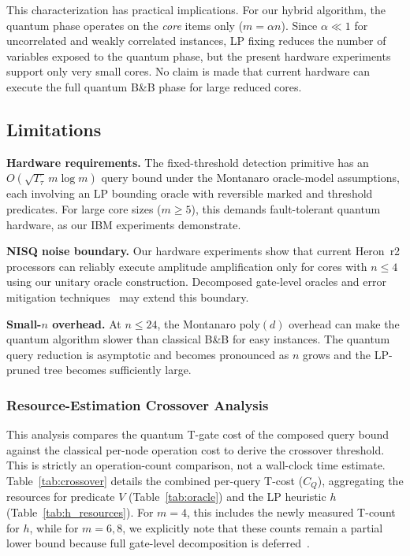 \documentclass[conference]{IEEEtran} \IEEEoverridecommandlockouts
\begin{document}
This characterization has practical implications. For our hybrid algorithm, the quantum phase operates on the \textit{core} items only ($m = \alpha n$). Since $\alpha \ll 1$ for uncorrelated and weakly correlated instances, LP fixing reduces the number of variables exposed to the quantum phase, but the present hardware experiments support only very small cores. No claim is made that current hardware can execute the full quantum B\&B phase for large reduced cores.


\subsection{Limitations}

\textbf{Hardware requirements.} The fixed-threshold detection primitive has an $O(\sqrt{T_{\tau}}\,m\log m)$ query bound under the Montanaro oracle-model assumptions, each involving an LP bounding oracle with reversible marked and threshold predicates. For large core sizes ($m \geq 5$), this demands fault-tolerant quantum hardware, as our IBM experiments demonstrate.

\textbf{NISQ noise boundary.} Our hardware experiments show that current Heron~r2 processors can reliably execute amplitude amplification only for cores with $n \leq 4$ using our unitary oracle construction. Decomposed gate-level oracles and error mitigation techniques~\cite{ref31} may extend this boundary.

\textbf{Small-$n$ overhead.} At $n \leq 24$, the Montanaro $\text{poly}(d)$ overhead can make the quantum algorithm slower than classical B\&B for easy instances. The quantum query reduction is asymptotic and becomes pronounced as $n$ grows and the LP-pruned tree becomes sufficiently large.

\subsubsection{Resource-Estimation Crossover Analysis}
This analysis compares the quantum T-gate cost of the composed query bound against the classical per-node operation cost to derive the crossover threshold. This is strictly an operation-count comparison, not a wall-clock time estimate. Table~\ref{tab:crossover} details the combined per-query T-cost ($C_Q$), aggregating the resources for predicate $V$ (Table~\ref{tab:oracle}) and the LP heuristic $h$ (Table~\ref{tab:h_resources}). For $m=4$, this includes the newly measured T-count for $h$, while for $m=6, 8$, we explicitly note that these counts remain a partial lower bound because full gate-level decomposition is deferred~\cite{vedral1996}.
\end{document}
